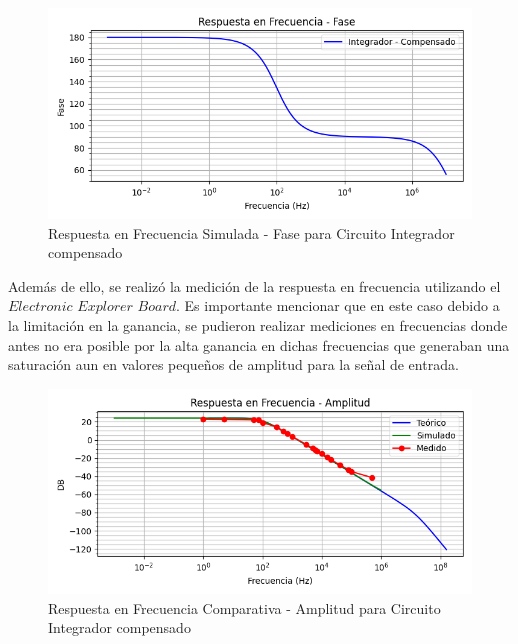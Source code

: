 \begin{figure}[H]
    \centering 
    \includegraphics [scale=1] {../Ejercicio3-CircuitoIntegradoresyDerivadores/Imagenes/diagrama-bode-integrador-simulado-compensado-fase.png} 
    \caption{Respuesta en Frecuencia Simulada - Fase para Circuito Integrador compensado }
    \label{fig:emptyPlotTool}
\end{figure}

Además de ello, se realizó la medición de la respuesta en frecuencia utilizando el $Electronic$ $Explorer$ $Board$. Es importante mencionar
que en este caso debido a la limitación en la ganancia, se pudieron realizar mediciones en frecuencias donde antes no era posible por la alta ganancia
en dichas frecuencias que generaban una saturación aun en valores pequeños de amplitud para la señal de entrada.

\begin{figure}[H]
    \centering 
    \includegraphics [scale=1] {../Ejercicio3-CircuitoIntegradoresyDerivadores/Imagenes/transferencia-comparativo-todo-amplitud.png} 
    \caption{Respuesta en Frecuencia Comparativa - Amplitud para Circuito Integrador compensado}
    \label{fig:emptyPlotTool}
\end{figure}

